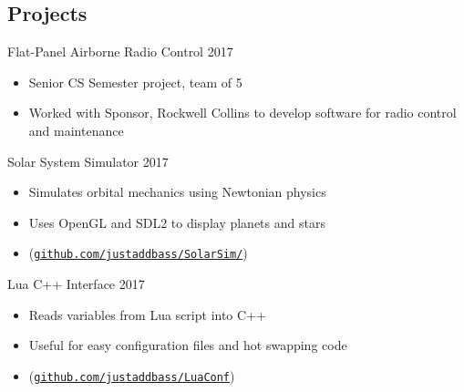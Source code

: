 \documentclass[line,margin]{res}
\begin{document}
\begin{resume}
\section{Projects}
\vspace{12pt}


Flat-Panel Airborne Radio Control
\hfill 2017
	\begin{itemize} \itemsep -2pt
		\item Senior CS Semester project, team of 5
		\item Worked with Sponsor, Rockwell Collins to develop software for radio control and maintenance
	\end{itemize}

\vspace{-8pt}
Solar System Simulator
\hfill 2017
	\begin{itemize} \itemsep -2pt
		\item Simulates orbital mechanics using Newtonian physics
		\item Uses OpenGL and SDL2 to display planets and stars
		\item (\href{https://github.com/justaddbass/SolarSim/}{\texttt{github.com/justaddbass/SolarSim/}})
	\end{itemize}

\vspace{-8pt}
Lua C++ Interface
\hfill 2017
	\begin{itemize} \itemsep -2pt
		\item Reads variables from Lua script into C++
		\item Useful for easy configuration files and hot swapping code
		\item  (\href{https://github.com/justaddbass/LuaConf}{\texttt{github.com/justaddbass/LuaConf}})
		\end{itemize}



\end{resume}
\end{document}
